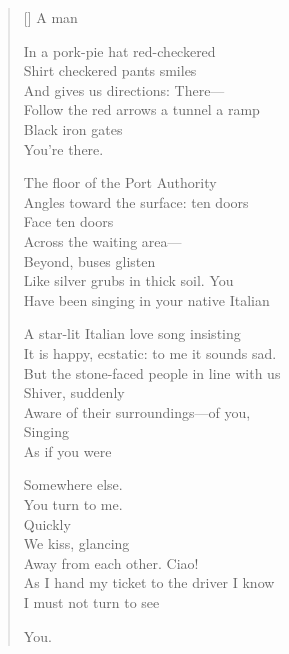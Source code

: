 \label{ch:orpheus}
\settowidth{\versewidth}{                                                A man}
\begin{verse}[\versewidth]
                                                A man

In a pork-pie hat     red-checkered\\
Shirt     checkered pants    smiles\\
And gives us directions:      There---\\
Follow the red arrows     a tunnel    a ramp\\
Black iron gates\\
You're there.

The floor of the Port Authority\\
Angles toward the surface: ten doors\\
Face ten doors\\
Across the waiting area---\\
Beyond, buses glisten\\
Like silver grubs in thick soil.     You\\
Have been singing in your native Italian

A star-lit Italian love song   insisting\\
It is happy, ecstatic: to me it sounds sad.\\
But the stone-faced people in line with us\\
Shiver, suddenly\\
Aware of their surroundings---of you,\\
Singing\\
As if you were

Somewhere else.\\
You turn to me.\\
Quickly\\
We kiss, glancing\\
Away from each other.     Ciao!\\
As I hand my ticket to the driver I know\\
I must not turn to see

You.
\end{verse}
